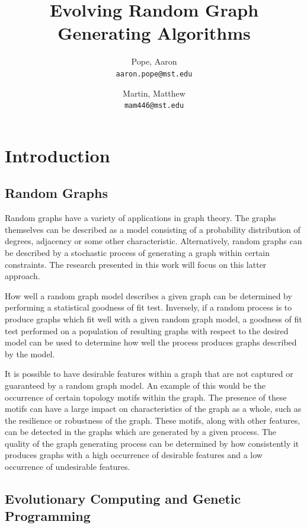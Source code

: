 \documentclass{article}
\begin{document}
\title{Evolving Random Graph Generating Algorithms}

\author{
Pope, Aaron\\
\texttt{aaron.pope@mst.edu}
\and
Martin, Matthew\\
\texttt{mam446@mst.edu}
}

\maketitle

\section{Introduction}

\subsection{Random Graphs}

Random graphs have a variety of applications in graph theory. The graphs themselves can be described as a model consisting of a probability distribution of degrees, adjacency or some other characteristic. Alternatively, random graphs can be described by a stochastic process of generating a graph within certain constraints. The research presented in this work will focus on this latter approach.

How well a random graph model describes a given graph can be determined by performing a statistical goodness of fit test. Inversely, if a random process is to produce graphs which fit well with a given random graph model, a goodness of fit test performed on a population of resulting graphs with respect to the desired model can be used to determine how well the process produces graphs described by the model. 

It is possible to have desirable features within a graph that are not captured or guaranteed by a random graph model. An example of this would be the occurrence of certain topology motifs within the graph. The presence of these motifs can have a large impact on characteristics of the graph as a whole, such as the resilience or robustness of the graph. These motifs, along with other features, can be detected in the graphs which are generated by a given process. The quality of the graph generating process can be determined by how consistently it produces graphs with a high occurrence of desirable features and a low occurrence of undesirable features.

\subsection{Evolutionary Computing and Genetic Programming}
\end{document}
